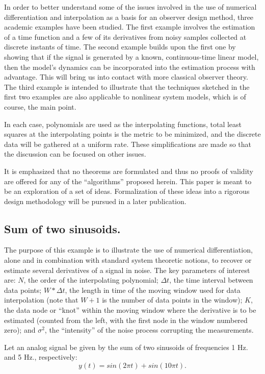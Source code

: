 In order to better understand some of the issues involved in the use of  
numerical differentiation and interpolation as a basis for an
observer design method, three academic
examples have been studied.  The first example
involves the estimation
of a time function and a few of its derivatives from noisy samples collected at
discrete instants of time.  The second example builds upon the first one
by showing that if the signal is generated by a known,
continuous-time linear model,
then the model's dynamics can be incorporated into the estimation
process with advantage.  This will bring us into contact with more classical observer
theory.  The third example is intended to illustrate that the techniques sketched in the
first two examples are
also applicable to nonlinear system models, which is of course, the main
point.  

In each case, polynomials are used as the interpolating
functions, total least squares at the interpolating points is the 
metric to be minimized, and the discrete data will be gathered at a uniform rate.
These simplifications are made so that the discussion can be focused on other issues.

It is emphasized that no theorems are formulated and thus no proofs of validity
are
offered for any of the ``algorithms'' proposed herein.  This paper is meant to be an
exploration of a set of ideas.  Formalization of these ideas into a rigorous design
methodology will be pursued in a later publication.  

\subsection{Sum of two sinusoids.}

The purpose of this example is to illustrate the use of numerical
differentiation, alone and 
in combination with standard system theoretic notions,
to recover or estimate several derivatives of a signal in noise.  The key
parameters of interest are: $N$, the order of the interpolating polynomial;
$\Delta t$, the time interval between data points;
$W * \Delta t$, the length in time of the moving window used for data interpolation
(note that $W + 1$ is the number of data points in the window);
$K$, the data node or ``knot'' within the moving window 
where the derivative is to be estimated (counted from the left, with
the first node in the window numbered zero); and $\sigma^2$, the ``intensity'' 
of the noise process corrupting the measurements.

Let an analog signal be given by the sum of two sinusoids of frequencies 1 Hz. and
5 Hz., respectively:
\begin{equation}
y(t) = sin(2 \pi t) + sin(10 \pi t).
\label{sines}
\end{equation}

